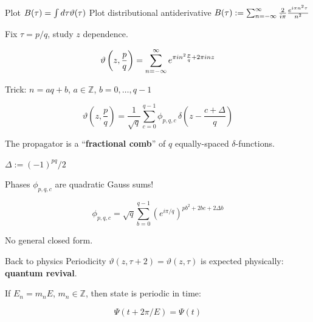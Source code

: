 \documentclass{beamer}
\newcommand\inputpgf[2]{{
\let\pgfimageWithoutPath\pgfimage
\renewcommand{\pgfimage}[2][]{\pgfimageWithoutPath[##1]{#1/##2}}

}}
\begin{document}
\begin{frame}{Plot $B(\tau) = \int d\tau \vartheta(\tau)$}
    Plot distributional antiderivative $B(\tau) := \sum_{n=-\infty}^\infty \frac{2}{i\pi} \frac{e^{i\pi n^2 \tau}}{n^2}$

    \scalebox{0.8}{\inputpgf{images}{batman.pgf}}
\end{frame}


\begin{frame}
    Fix $\tau = p/q$, study $z$ dependence.

    \begin{equation}
        \vartheta\left(z,\frac{p}{q}\right) = \sum_{n=-\infty}^\infty e^{\pi i n^2 \frac{p}{q} + 2\pi i n z}
        \label{}
    \end{equation}

    Trick: $n = aq + b$, $a \in \mathbb{Z}$, $b = 0,\ldots,q-1$

\begin{equation}
    \vartheta\left(z,\frac{p}{q}\right) = \frac{1}{\sqrt q} \sum_{c=0}^{q-1} \phi_{p,q,c} \, \delta\left(z - \frac{c+\Delta}{q}\right)
    \label{}
\end{equation}


The propagator is a ``\textbf{fractional comb}'' of $q$ equally-spaced $\delta$-functions.

\vfill

{\small $\Delta := (-1)^{pq}/2$}

\end{frame}

\begin{frame}

Phases $\phi_{p,q,c}$ are quadratic Gauss sums!

\begin{equation}
    \phi_{p,q,c} = \sqrt{q} \sum_{b=0}^{q-1} (e^{i\pi/q})^{pb^2 + 2bc + 2\Delta b}
    \label{}
\end{equation}

No general closed form.

\end{frame}

\begin{frame}{Back to physics}
    Periodicity $\vartheta(z,\tau + 2) = \vartheta(z,\tau)$ is expected physically: \textbf{quantum revival}.

   \vfill

    If $E_n = m_n E$, $m_n \in \mathbb{Z}$, then state is periodic in time:

    \begin{equation}\Psi(t + 2\pi/E) = \Psi(t)\end{equation}

\end{frame}
\end{document}
